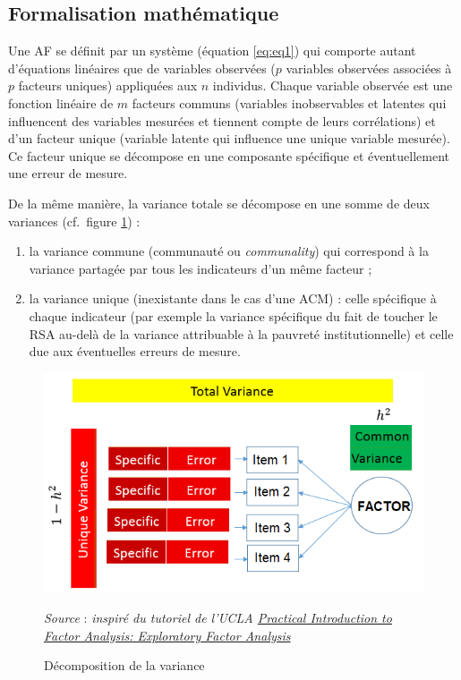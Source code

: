 \documentclass[12pt,a4paper]{reedthesis}
\begin{document}
\hypertarget{formalisation-mathuxe9matique}{%
\subsection{Formalisation mathématique}\label{formalisation-mathuxe9matique}}

Une AF se définit par un système (équation \eqref{eq:eq1}) qui comporte autant d'équations linéaires que de variables observées (\(p\) variables observées associées à \(p\) facteurs uniques) appliquées aux \(n\) individus. Chaque variable observée est une fonction linéaire de \(m\) facteurs communs (variables inobservables et latentes qui influencent des variables mesurées et tiennent compte de leurs corrélations) et d'un facteur unique (variable latente qui influence une unique variable mesurée). Ce facteur unique se décompose en une composante spécifique et éventuellement une erreur de mesure.

De la même manière, la variance totale se décompose en une somme de deux variances (cf.~figure \ref{fig:decompovar}) :
\begin{enumerate}
\def\labelenumi{\arabic{enumi}.}
\item
  la variance commune (communauté ou \emph{communality}) qui correspond à la variance partagée par tous les indicateurs d'un même facteur ;
\item
  la variance unique (inexistante dans le cas d'une ACM) : celle spécifique à chaque indicateur (par exemple la variance spécifique du fait de toucher le RSA au-delà de la variance attribuable à la pauvreté institutionnelle) et celle due aux éventuelles erreurs de mesure.
\end{enumerate}
\begin{figure}[!ht]

{\centering \includegraphics[width=0.75\linewidth]{figures/decompo_var} 

}

\caption[Décomposition de la variance]{Décomposition de la variance}\label{fig:decompovar}

\footnotesize


\emph{Source} : \emph{inspiré du tutoriel de l'UCLA \href{https://stats.idre.ucla.edu/spss/seminars/introduction-to-factor-analysis/a-practical-introduction-to-factor-analysis/}{ Practical Introduction to Factor Analysis: Exploratory Factor Analysis}}
\normalsize\end{figure}
\end{document}
